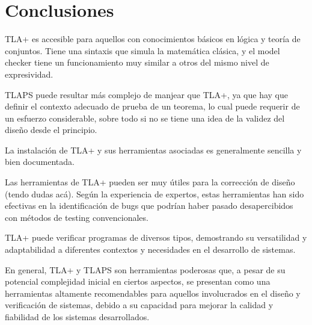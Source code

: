 \documentclass[runningheads]{llncs}
\begin{document}
\section{Conclusiones}

TLA+ es accesible para aquellos con conocimientos básicos en lógica y teoría de conjuntos. Tiene una sintaxis que simula la matemática clásica, y el model checker tiene un funcionamiento muy similar a otros del mismo nivel de expresividad.

TLAPS puede resultar más complejo de manjear que TLA+, ya que hay que definir el contexto adecuado de prueba de un teorema, lo cual puede requerir de un esfuerzo considerable, sobre todo si no se tiene una idea de la validez del diseño desde el principio. 

La instalación de TLA+ y sus herramientas asociadas es generalmente sencilla y bien documentada.

Las herramientas de TLA+ pueden ser muy útiles para la corrección de diseño (tendo dudas acá). Según la experiencia de expertos, estas herramientas han sido efectivas en la identificación de bugs que podrían haber pasado desapercibidos con métodos de testing convencionales.

TLA+ puede verificar programas de diversos tipos, demostrando su versatilidad y adaptabilidad a diferentes contextos y necesidades en el desarrollo de sistemas.

En general, TLA+ y TLAPS son herramientas poderosas que, a pesar de su potencial complejidad inicial en ciertos aspectos, se presentan como una herramientas altamente recomendables para aquellos involucrados en el diseño y verificación de sistemas, debido a su capacidad para mejorar la calidad y fiabilidad de los sistemas desarrollados. 
\end{document}
